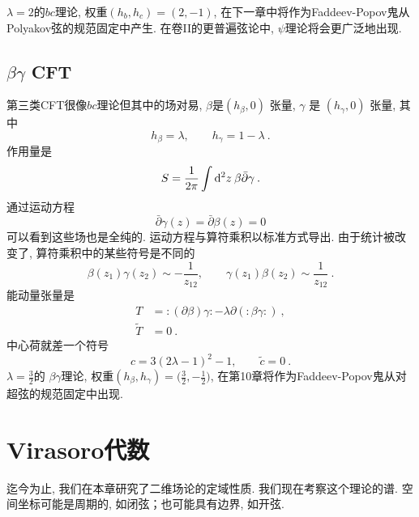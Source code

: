 $\lambda=2$的$bc$理论, 权重$(h_{b}, h_{c})=(2,-1)$, 在下一章中将作为Faddeev-Popov鬼从Polyakov弦的规范固定中产生. 在卷II的更普遍弦论中, $\psi$理论将会更广泛地出现. \\


\subsection*{$\beta\gamma$ CFT}
第三类CFT很像$bc$理论但其中的场对易, $\beta$是$(h_{\beta}, 0)$ 张量, $\gamma$ 是 $(h_{\gamma}, 0)$ 张量, 其中
\begin{equation}
h_{\beta}=\lambda, \qquad h_{\gamma}=1-\lambda \:. \label{2.5.19}
\end{equation}
作用量是
\begin{equation}
S=\frac{1}{2 \pi} \int \mathrm{d}^{2} z \: \beta \bar{\partial} \gamma \:. \label{2.5.20}
\end{equation}
通过运动方程
\begin{equation}
\bar{\partial} \gamma(z)=\bar{\partial} \beta(z)=0
\end{equation}
可以看到这些场也是全纯的. 运动方程与算符乘积以标准方式导出. 由于统计被改变了, 算符乘积中的某些符号是不同的
\begin{equation}
\beta(z_{1}) \gamma(z_{2}) \sim-\frac{1}{z_{12}}, \qquad \gamma(z_{1}) \beta(z_{2}) \sim \frac{1}{z_{12}} \:. \label{2.5.22}
\end{equation}
能动量张量是
\begin{subequations} \label{2.5.23}
\begin{align}
T&=:\mathrel{(\partial \beta) \gamma}:-\lambda \partial(:\mathrel{\beta \gamma}:) \:, \label{2.5.23a} \\
\tilde{T}&=0 \:.  \label{2.5.23b}
\end{align} 
\end{subequations}
中心荷就差一个符号
\begin{equation}
c=3(2 \lambda-1)^{2}-1, \qquad \tilde{c}=0 \:.
\end{equation}
$\lambda=\frac{3}{2}$的 $\beta\gamma$理论, 权重$(h_{\beta}, h_{\gamma})=\bigl(\tfrac{3}{2},-\tfrac{1}{2}\bigr)$, 在第10章将作为Faddeev-Popov鬼从对超弦的规范固定中出现.

\section{\texorpdfstring{Virasoro代数}{2.6 The Virasoro algebra}}

迄今为止, 我们在本章研究了二维场论的定域性质. 我们现在考察这个理论的谱. 空间坐标可能是周期的, 如闭弦；也可能具有边界, 如开弦. 

